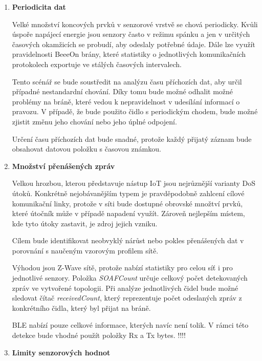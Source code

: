    \begin{enumerate}
    \item \textbf{Periodicita dat}
    
    Velké množství koncových prvků v senzorové vrstvě se chová periodicky. Kvůli úspoře napájecí
    energie jsou senzory často v režimu spánku a jen v určitých časových okamžicích se probudí, 
    aby odeslaly potřebné údaje. Dále lze využít pravidelnosti BeeeOn brány, které statistiky
    o jednotlivých komunikačních protokolech exportuje ve stálých časových intervalech. 
    
    Tento scénář se bude soustředit na analýzu času příchozích dat, aby určil případné
    nestandardní chování. Díky tomu bude možné odhalit možné problémy na bráně, které vedou k 
    nepravidelnost v udesílání informací o pravozu. V případě, že bude použito čidlo s periodickým 
    chodem, bude možné zjistit změnu jeho chování nebo jeho úplné odpojení.
    
    Určení času příchozích dat bude snadné, protože každý přijatý záznam bude obsahovat 
    datovou položku s časovou známkou.
    
    \item \textbf{Množství přenášených zpráv} \label{dos}
    
    Velkou hrozbou, kterou představuje nástup IoT jsou nejrůznější varianty DoS útoků. Konkrétně
    nejobávanějším typem je pravděpodobně zahlcení cílové komunikační linky, protože v síti bude 
    dostupné obrovské množtví prvků, které útočník může v případě napadení využít. Zároveň
    nejlepším místem, kde tyto útoky zastavit, je zdroj jejich vzniku.
        
    Cílem bude identifikovat neobvyklý nárůst nebo pokles přenášených dat v porovnání 
    s naučeným vzorovým profilem sítě. 
    
    Výhodou jsou Z-Wave sítě, protože nabízí statistiky pro celou síť i pro jednotlivé senzory. 
    Položka \textit{SOAFCount} určuje celkový počet detekovaných zpráv ve vytvořené topologii.
    Při analýze
    jednotlivých čidel bude možné sledovat čítač \textit{receivedCount}, který reprezentuje
    počet odeslaných 
    zpráv z konkrétního čidla, který byl přijat na bráně.
    
    BLE nabízí pouze celkové informace, kterých navíc není tolik. V rámci této detekce bude vhodné 
    použít položky Rx a Tx bytes. !!!!
    
    \item \textbf{Limity senzorových hodnot}
    

\end{enumerate}
